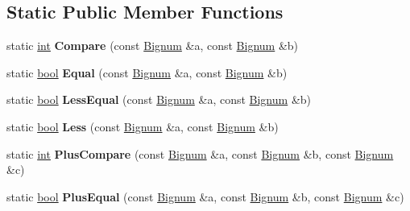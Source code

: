 \subsection*{Static Public Member Functions}
\begin{DoxyCompactItemize}
\item 
\mbox{\label{classv8_1_1internal_1_1Bignum_abd9070a6a20568f1d8cd3a08aef2b83e}} 
static \mbox{\hyperlink{classint}{int}} {\bfseries Compare} (const \mbox{\hyperlink{classv8_1_1internal_1_1Bignum}{Bignum}} \&a, const \mbox{\hyperlink{classv8_1_1internal_1_1Bignum}{Bignum}} \&b)
\item 
\mbox{\label{classv8_1_1internal_1_1Bignum_a59b3c8a39ea9d736d20360cffe274acb}} 
static \mbox{\hyperlink{classbool}{bool}} {\bfseries Equal} (const \mbox{\hyperlink{classv8_1_1internal_1_1Bignum}{Bignum}} \&a, const \mbox{\hyperlink{classv8_1_1internal_1_1Bignum}{Bignum}} \&b)
\item 
\mbox{\label{classv8_1_1internal_1_1Bignum_a6b79c599b480768a071b4c78953d1377}} 
static \mbox{\hyperlink{classbool}{bool}} {\bfseries Less\+Equal} (const \mbox{\hyperlink{classv8_1_1internal_1_1Bignum}{Bignum}} \&a, const \mbox{\hyperlink{classv8_1_1internal_1_1Bignum}{Bignum}} \&b)
\item 
\mbox{\label{classv8_1_1internal_1_1Bignum_a8ac355faefc238fb7896d9f9b8f92a14}} 
static \mbox{\hyperlink{classbool}{bool}} {\bfseries Less} (const \mbox{\hyperlink{classv8_1_1internal_1_1Bignum}{Bignum}} \&a, const \mbox{\hyperlink{classv8_1_1internal_1_1Bignum}{Bignum}} \&b)
\item 
\mbox{\label{classv8_1_1internal_1_1Bignum_abcc8a3bef0ecc80e0fdf91cf3525930f}} 
static \mbox{\hyperlink{classint}{int}} {\bfseries Plus\+Compare} (const \mbox{\hyperlink{classv8_1_1internal_1_1Bignum}{Bignum}} \&a, const \mbox{\hyperlink{classv8_1_1internal_1_1Bignum}{Bignum}} \&b, const \mbox{\hyperlink{classv8_1_1internal_1_1Bignum}{Bignum}} \&c)
\item 
\mbox{\label{classv8_1_1internal_1_1Bignum_aee160e99c96f72218c024a094f5fa9f4}} 
static \mbox{\hyperlink{classbool}{bool}} {\bfseries Plus\+Equal} (const \mbox{\hyperlink{classv8_1_1internal_1_1Bignum}{Bignum}} \&a, const \mbox{\hyperlink{classv8_1_1internal_1_1Bignum}{Bignum}} \&b, const \mbox{\hyperlink{classv8_1_1internal_1_1Bignum}{Bignum}} \&c)

\end{DoxyCompactItemize}
